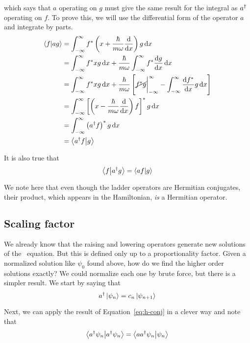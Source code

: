 which says that $a$ operating on $g$ must give the same result for the integral as $a^{\dagger}$ operating on $f$. To prove this, we will use the differential form of the operator $a$ and integrate by parts.
\begin{align*}
	\braket{f}{ag} &= \int_{-\infty}^{\infty} f^* \left(x + \frac{\hbar}{m\omega} \dv{x} \right)g \dd{x} \\
	&= \int_{-\infty}^{\infty} f^*xg \dd{x} + \frac{\hbar}{m\omega} \int_{-\infty}^{\infty} f^* \dv{g}{x} \dd{x} \\
	&= \int_{-\infty}^{\infty} f^*xg \dd{x} + \frac{\hbar}{m\omega} \left[ \cancel{f^*g} \bigg|_{-\infty}^{\infty} - \int_{-\infty}^{\infty} \dv{f^*}{x} g \dd{x} \right] \\
	&= \int_{-\infty}^{\infty} \left[ \left(x - \frac{\hbar}{m\omega} \dv{x}\right) f \right]^* g \dd{x} \\
	&= \int_{-\infty}^{\infty} \left(a^{\dagger} f\right)^*g \dd{x} \\
	&= \braket{a^{\dagger} f}{g} 
\end{align*}

It is also true that
\begin{equation*}
	\braket{f}{a^{\dagger} g} = \braket{af}{g}
\end{equation*}

We note here that even though the ladder operators are Hermitian conjugates, their product, which appears in the Hamiltonian, \emph{is} a Hermitian operator.


\subsection{Scaling factor}
We already know that the raising and lowering operators generate new solutions of the \Sch\ equation. But this is defined only up to a proportionality factor. Given a normalized solution like $\psi_0$ found above, how do we find the higher order solutions exactly? We could normalize each one by brute force, but there is a simpler result. We start by saying that 
\begin{equation*}
	a^{\dagger} \ket{\psi_n} = c_n \ket{\psi_{n+1}}
\end{equation*}

Next, we can apply the result of Equation~\ref{eq:h-conj} in a clever way and note that
\begin{equation*}
	\braket{a^{\dagger} \psi_n}{a^{\dagger} \psi_n} = \braket{aa^{\dagger} \psi_n}{\psi_n}
\end{equation*}

